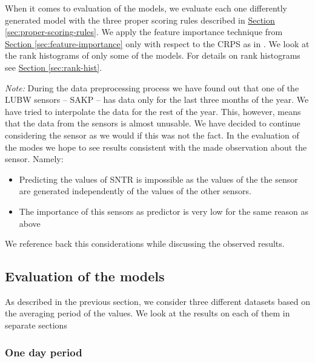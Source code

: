 \documentclass[12pt,a4paper,twoside]{scrartcl}
\numberwithin{equation}{section}
\newcommand{\refsec}[1]{\hyperref[#1]{Section \ref*{#1}}}
\begin{document}
When it comes to evaluation of the models, we evaluate each one differently generated model with the three proper scoring rules described in \refsec{sec:proper-scoring-rules}. We apply the feature importance technique from \refsec{sec:feature-importance} only with respect to the CRPS as in \cite{lerch2018}. We look at the rank histograms of only some of the models. For details on rank histograms see \refsec{sec:rank-hist}.

\emph{Note:} During the data preprocessing process we have found out that one of the LUBW sensors -- SAKP -- has data only for the last three months of the year. We have tried to interpolate the data for the rest of the year. This, however, means that the data from the sensors is almost unusable. We have decided to continue considering the sensor as we would if this was not the fact. In the evaluation of the modes we hope to see results consistent with the made observation about the sensor. Namely:
\begin{itemize}
\item Predicting the values of SNTR is impossible as the values of the the sensor are generated independently of the values of the other sensors.
\item The importance of this sensors as predictor is very low for the same reason as above
\end{itemize}
We reference back this considerations while discussing the observed results.
\subsection{Evaluation of the models}\label{sec:eval-model}
As described in the previous section, we consider three different datasets based on the averaging period of the values. We look at the results on each of them in separate sections
\subsubsection{One day period}
\end{document}
